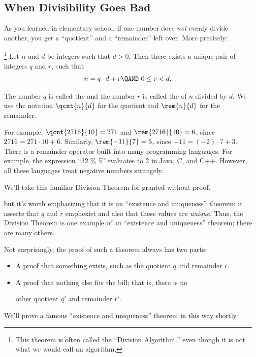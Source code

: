 \subsection{When Divisibility Goes Bad}

As you learned in elementary school, if one number does \emph{not}
evenly divide another, you get a ``quotient'' and a ``remainder'' left
over.  More precisely:

\begin{theorem}%
\footnote{This theorem is often called the ``Division Algorithm,'' even
though it is not what we would call an algorithm.}  Let $n$ and $d$ be
integers such that $d > 0$.  Then there exists a unique pair of
integers $q$ and $r$, such that
\begin{equation}\label{nqdr}
n = q \cdot d + r \QAND\ 0  \leq r < d.
\end{equation}
\end{theorem}

The number $q$ is called the  and the number $r$ is
called the  of $n$ divided by $d$.  We use the
notation $\qcnt{n}{d}$ for the quotient and $\rem{n}{d}$ for the
remainder.

For example, $\qcnt{2716}{10} = 271$ and $\rem{2716}{10} = 6$, since
$2716 = 271 \cdot 10 + 6$.  Similarly, $\rem{-11}{7} = 3$, since $-11
= (-2) \cdot 7 + 3$.  There is a remainder operator built into many
programming languages.  For example, the expression ``32 \% 5''
evaluates to 2 in Java, C, and C++.  However, all these languages
treat negative numbers strangely.

We'll take this familiar Division Theorem for granted without proof.

\begin{editingnotes}

but it's worth emphasizing that it is an ``existence and uniqueness''
theorem: it asserts that 
$q$ and $r$ emph{exist} and also that these values
are \emph{unique}.  Thus, the Division Theorem is one example of an
``existence and uniqueness'' theorem; there are many others.

Not surprisingly, the proof of such a theorem always has
two parts:
%
\begin{itemize}
\item A proof that something exists, such as the quotient $q$ and
remainder $r$.
\item A proof that nothing else fits the bill; that is, there is no

other quotient $q'$ and remainder $r'$.
\end{itemize}

We'll prove a famous ``existence and uniqueness'' theorem in this way
shortly.

\end{editingnotes}

